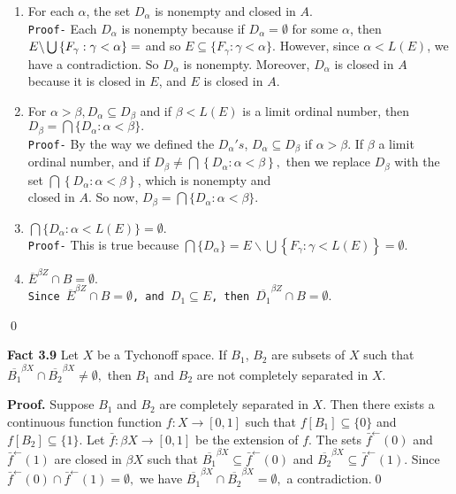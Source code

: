 \documentclass{article}
\begin{document}
\begin{enumerate}
\item For each $  \alpha  $, the set $ D_\alpha  $ is nonempty and closed in $A$.\\
\texttt{Proof-} Each $D_\alpha$ is nonempty because if $D_\alpha=\emptyset$ for some $\alpha$, then $E\backslash \bigcup \left\{F_\gamma: \gamma<\alpha\right\}=\empty$ and so $E \subseteq \{F_\gamma: \gamma<\alpha\}$. However, since $\alpha<L(E)$, we have a contradiction. So $D_\alpha$ is nonempty. Moreover, $D_\alpha$ is closed in $A$ because it is closed in $E$, and $E$ is closed in $A$.
\vskip 10pt
\item For $ \alpha>\beta, D_\alpha \subseteq D_\beta  $ and if $  \beta <L(E) $ is a limit ordinal number, then\\$  D_\beta=\bigcap \{D_\alpha:\alpha <\beta\}.$\\
\texttt{Proof-} By the way we defined the ${D_\alpha}'s$, $D_\alpha\subseteq D_\beta$ if $\alpha>\beta$. If $\beta$ a limit ordinal number, and 
if $D_\beta \neq \bigcap\left\{D_\alpha:\alpha<\beta\right\}, $ then we replace $D_\beta$ with the set $\bigcap\left\{D_\alpha:\alpha<\beta\right\}$, which is nonempty and\\ closed in $A$. So now, $ D_\beta=\bigcap \{D_\alpha:\alpha <\beta\}.$
\vskip 10pt
\item $ \bigcap\{D_\alpha: \alpha< L(E)\}=\emptyset . $\\
\texttt{Proof-} This is true because $ \bigcap\{D_\alpha\}= E\backslash\bigcup\left\{F_\gamma: \gamma<L(E)\right\}=\emptyset.$

\vskip 10pt
\item $\overline{E}^{\beta Z} \cap B =\emptyset.$\\
\texttt{Since $\overline{E}^{\beta Z} \cap B=\emptyset$, and $D_1\subseteq E$, then $\overline{D_1}^{\beta Z}\cap B=\emptyset.$}	 
\end{enumerate} \qed



\vskip 30pt



\textbf{Fact 3.9} Let $X$ be a Tychonoff space. If $B_1$, $B_2$ are subsets of $X$ such that $\overline{B_1}^{\beta X} \cap \overline{B_2}^{\beta X} \neq \emptyset,$ then $B_1$ and $B_2$ are not completely separated in $X$. 


\vskip 15pt


\textbf{Proof.} Suppose $B_1$ and $B_2$ are completely separated in $X$. Then there exists a continuous function function $f:X\rightarrow [0,1]$ such that 
$f\left[B_1\right] \subseteq\{0\}$ and $f\left[B_2\right]\subseteq \{1\}.$ Let $\bar{f}: \beta X\rightarrow [0,1]$ be the extension of $f$. The sets $\bar{f}^\leftarrow(0)$ and $\bar{f}^{\leftarrow}(1)$ are closed in $\beta X$ such that $\overline{B_1}^{\beta X} \subseteq \bar{f}^\leftarrow(0)$ and $\overline{B_2}^{\beta X} \subseteq \bar{f}^\leftarrow(1).$ Since $\bar{f}^\leftarrow(0)\cap\bar{f}^\leftarrow(1)=\emptyset,$ we have $\overline{B_1}^{\beta X}\cap \overline{B_2}^{\beta X}=\emptyset,$ a contradiction.\qed 
\end{document}
